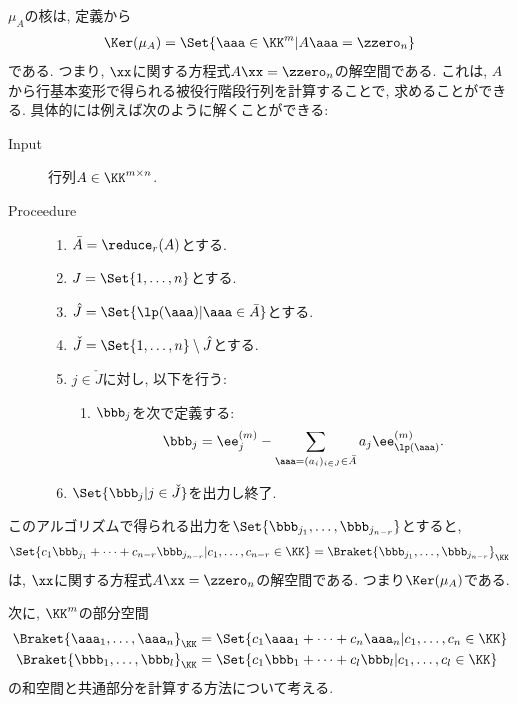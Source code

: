 $\mu_A$の核は,
定義から
\begin{align*}
  \Ker(\mu_A)=\Set{\aaa\in \KK^m |A\aaa=\zzero_n}
\end{align*}
である.
つまり,
$\xx$に関する方程式$A\xx=\zzero_n$の解空間である.
これは,
$A$から行基本変形で得られる被役行階段行列を計算することで,
求めることができる.
具体的には例えば次のように解くことができる:
\begin{algorithm}\makebox{}
\begin{description}
\item[Input]
  行列$A\in\KK^{m\times n}$.
\item[Proceedure]\makebox{}
  \begin{enumerate}
  \item $\bar A=\reduce_r(A)$とする.
  \item $J=\Set{1,\ldots,n}$とする.
  \item $\hat J=\Set{\lp(\aaa)|\aaa\in\bar  A }$とする. 
  \item $\check J=\Set{1,\ldots,n}\setminus \hat J$とする.
  \item $j\in \check J$に対し,
    以下を行う:
    \begin{enumerate}
    \item $\bbb_j$を次で定義する:
      \begin{align*}
        \bbb_j = \ee^{(m)}_j - \sum_{\aaa=(a_i)_{i\in J}\in\bar A}a_j \ee^{(m)}_{\lp(\aaa)}.
        \end{align*}
    \end{enumerate}
  \item $\Set{\bbb_j|j\in \check J}$を出力し終了.
  \end{enumerate}
\end{description}
\end{algorithm}
このアルゴリズムで得られる出力を$\Set{\bbb_{j_1},\ldots,\bbb_{j_{n-r}}}$とすると,
\begin{align*}
  \Set{c_1\bbb_{j_1}+\cdots+c_{n-r}\bbb_{j_{n-r}}|c_1,\ldots,c_{n-r}\in\KK}
=\Braket{\bbb_{j_1},\ldots,\bbb_{j_{n-r}}}_{\KK}
\end{align*}
は,
$\xx$に関する方程式$A\xx=\zzero_n$の解空間である.
つまり$\Ker(\mu_A)$である.


次に,
$\KK^m$の部分空間
\begin{align*}
  \Braket{\aaa_1,\ldots,\aaa_n}_{\KK}
  &=\Set{c_1\aaa_1+\cdots+c_n\aaa_n|c_1,\ldots,c_n\in \KK}\\
  \Braket{\bbb_1,\ldots,\bbb_l}_{\KK}
  &=\Set{c_1\bbb_1+\cdots+c_l\bbb_l|c_1,\ldots,c_l\in \KK}
\end{align*}
の和空間と共通部分を計算する方法について考える.

